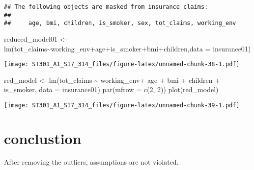 \documentclass[
]{article}
\newenvironment{Shaded}{\begin{snugshade}}{\end{snugshade}}
\newcommand{\AttributeTok}[1]{\textcolor[rgb]{0.77,0.63,0.00}{#1}}
\newcommand{\DecValTok}[1]{\textcolor[rgb]{0.00,0.00,0.81}{#1}}
\newcommand{\FunctionTok}[1]{\textcolor[rgb]{0.00,0.00,0.00}{#1}}
\newcommand{\NormalTok}[1]{#1}
\newcommand{\OtherTok}[1]{\textcolor[rgb]{0.56,0.35,0.01}{#1}}
\newcommand{\SpecialCharTok}[1]{\textcolor[rgb]{0.00,0.00,0.00}{#1}}
\begin{document}
\begin{verbatim}
## The following objects are masked from insurance_claims:
## 
##     age, bmi, children, is_smoker, sex, tot_claims, working_env
\end{verbatim}

\begin{Shaded}
\begin{Highlighting}[]
\NormalTok{reduced\_model01 }\OtherTok{\textless{}{-}}\FunctionTok{lm}\NormalTok{(tot\_claims}\SpecialCharTok{\textasciitilde{}}\NormalTok{working\_env}\SpecialCharTok{+}\NormalTok{age}\SpecialCharTok{+}\NormalTok{is\_smoker}\SpecialCharTok{+}\NormalTok{bmi}\SpecialCharTok{+}\NormalTok{children,}\AttributeTok{data =}\NormalTok{ insurance01)}
\end{Highlighting}
\end{Shaded}

\begin{Shaded}
\end{Shaded}

\texttt{[image: ST301\_A1\_S17\_314\_files/figure-latex/unnamed-chunk-38-1.pdf]}

\begin{Shaded}
\begin{Highlighting}[]
\NormalTok{red\_model }\OtherTok{\textless{}{-}} \FunctionTok{lm}\NormalTok{(tot\_claims }\SpecialCharTok{\textasciitilde{}}\NormalTok{ working\_env}\SpecialCharTok{+}\NormalTok{ age }\SpecialCharTok{+}\NormalTok{ bmi }\SpecialCharTok{+}\NormalTok{ children }\SpecialCharTok{+}\NormalTok{ is\_smoker, }\AttributeTok{data =}\NormalTok{ insurance01)}
\FunctionTok{par}\NormalTok{(}\AttributeTok{mfrow =} \FunctionTok{c}\NormalTok{(}\DecValTok{2}\NormalTok{, }\DecValTok{2}\NormalTok{))}
\FunctionTok{plot}\NormalTok{(red\_model)}
\end{Highlighting}
\end{Shaded}

\texttt{[image: ST301\_A1\_S17\_314\_files/figure-latex/unnamed-chunk-39-1.pdf]}

\hypertarget{conclustion}{%
\section{conclustion}\label{conclustion}}

After removing the outliers, assumptions are not violated.
\end{document}
